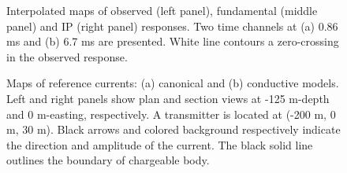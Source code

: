 \documentclass[extra,mreferee]{gji}
\begin{document}
\begin{figure}
  \caption{Interpolated maps of observed (left panel), fundamental (middle panel) and IP (right panel) responses. Two time channels at (a) 0.86 ms and (b) 6.7 ms are presented. White line contours a zero-crossing in the observed response.
  }
  \label{F:IPresp_Plan}
\end{figure}

\begin{figure}
  \caption{Maps of reference currents: (a) canonical and (b) conductive models. Left and right panels show plan and section views at -125 m-depth and 0 m-easting, respectively. A transmitter is located at (-200 m, 0 m, 30 m). Black arrows and colored background respectively indicate the direction and amplitude of the current. The black solid line outlines the boundary of chargeable body.}
  \label{F:ReferenceCurrent}
\end{figure}
\end{document}
